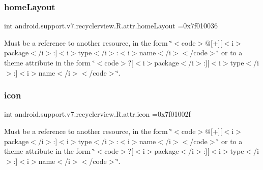 \subsubsection{\texorpdfstring{home\+Layout}{homeLayout}}
{\footnotesize\ttfamily int android.\+support.\+v7.\+recyclerview.\+R.\+attr.\+home\+Layout =0x7f010036\hspace{0.3cm}{\ttfamily [static]}}

Must be a reference to another resource, in the form \char`\"{}$<$code$>$@\mbox{[}+\mbox{]}\mbox{[}$<$i$>$package$<$/i$>$\+:\mbox{]}$<$i$>$type$<$/i$>$\+:$<$i$>$name$<$/i$>$$<$/code$>$\char`\"{} or to a theme attribute in the form \char`\"{}$<$code$>$?\mbox{[}$<$i$>$package$<$/i$>$\+:\mbox{]}\mbox{[}$<$i$>$type$<$/i$>$\+:\mbox{]}$<$i$>$name$<$/i$>$$<$/code$>$\char`\"{}. \mbox{\label{classandroid_1_1support_1_1v7_1_1recyclerview_1_1R_1_1attr_a8027aa2a8786b29d88d51290c6ec678b}} 
\subsubsection{\texorpdfstring{icon}{icon}}
{\footnotesize\ttfamily int android.\+support.\+v7.\+recyclerview.\+R.\+attr.\+icon =0x7f01002f\hspace{0.3cm}{\ttfamily [static]}}

Must be a reference to another resource, in the form \char`\"{}$<$code$>$@\mbox{[}+\mbox{]}\mbox{[}$<$i$>$package$<$/i$>$\+:\mbox{]}$<$i$>$type$<$/i$>$\+:$<$i$>$name$<$/i$>$$<$/code$>$\char`\"{} or to a theme attribute in the form \char`\"{}$<$code$>$?\mbox{[}$<$i$>$package$<$/i$>$\+:\mbox{]}\mbox{[}$<$i$>$type$<$/i$>$\+:\mbox{]}$<$i$>$name$<$/i$>$$<$/code$>$\char`\"{}. \mbox{\label{classandroid_1_1support_1_1v7_1_1recyclerview_1_1R_1_1attr_a147e0a112ef517cf607cccb4d1661e38}} 
